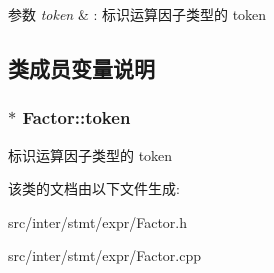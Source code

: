 \begin{DoxyParams}{参数}
{\em token} & \+: 标识运算因子类型的 token \\
\hline
\end{DoxyParams}


\subsection{类成员变量说明}
\subsubsection[{\texorpdfstring{token}{token}}]{$\ast$ Factor\+::token}\hypertarget{class_factor_ab2c56fe952c0e3dad6006950e166495b}{}\label{class_factor_ab2c56fe952c0e3dad6006950e166495b}
标识运算因子类型的 token 

该类的文档由以下文件生成\+:\begin{DoxyCompactItemize}
\item 
src/inter/stmt/expr/Factor.\+h\item 
src/inter/stmt/expr/Factor.\+cpp\end{DoxyCompactItemize}

